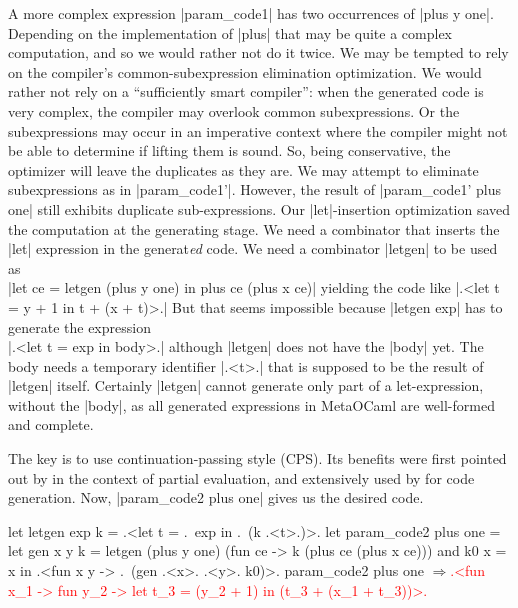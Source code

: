 \documentclass{llncs}
\newcommand{\evalresult}[1]{\ensuremath{\Longrightarrow}\textcolor{red}{#1}}
\begin{document}
A more complex expression |param_code1| has two occurrences of 
|plus y one|. Depending on the implementation of |plus| that may be quite a
complex computation, and so we would rather not do it twice. We may be
tempted to rely on the compiler's common-subexpression elimination
optimization. We would rather not rely on a ``sufficiently smart
compiler'': when the generated code is very complex, the compiler may
overlook common subexpressions.  Or the subexpressions may occur in an
imperative context where the compiler might not be able to determine
if lifting them is sound. So, being conservative, the optimizer will
leave the duplicates as they are. We may attempt to eliminate
subexpressions as in |param_code1'|. However, the result of
|param_code1' plus one| still exhibits duplicate sub-expressions. 
Our |let|-insertion
optimization saved the computation at the generating stage. 
We need a combinator that inserts the |let| expression in the
generat\emph{ed} code. We need a combinator |letgen| to be used
as\\|let ce = letgen (plus y one) in plus ce (plus x ce)| 
yielding the code like |.<let t = y + 1 in t + (x + t)>.|
But that seems impossible because |letgen exp| has to generate
the expression\\|.<let t = exp in body>.| although |letgen| does not have
the |body| yet. The body needs a temporary identifier |.<t>.| that
is supposed to be the result of |letgen| itself. 
Certainly |letgen| cannot generate only part of a let-expression,
without the |body|,  as all generated expressions in
MetaOCaml are well-formed and complete.

The key is to use continuation-passing style (CPS). Its benefits were first
pointed out by \cite{Bondorf:92} in the context
of partial evaluation, and extensively used by \cite{KiselyovTaha} for code
generation. Now, |param_code2 plus one| gives us the desired code. 

\begin{code}
let letgen exp k = .<let t = .~exp in .~(k .<t>.)>.
let param_code2 plus one =
  let gen x y k = letgen (plus y one) (fun ce -> k (plus ce (plus x ce)))
  and k0 x = x
  in .<fun x y -> .~(gen .<x>. .<y>. k0)>.
param_code2 plus one
\evalresult{.<fun x_1 -> fun y_2 -> let t_3 = (y_2 + 1) in (t_3 + (x_1 + t_3))>.}
\end{code}
\end{document}

